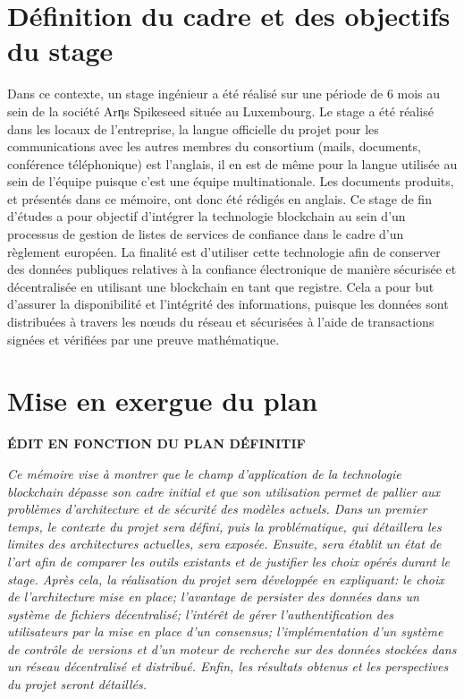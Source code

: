 \documentclass{tnreport}
\begin{document}
\section{Définition du cadre et des objectifs du stage}

Dans ce contexte, un stage ingénieur a été réalisé sur une période de 6 mois au sein de la société Arηs Spikeseed située au Luxembourg. 
Le stage a été réalisé dans les locaux de l'entreprise, la langue officielle du projet pour les communications avec les autres membres du consortium (mails, documents, conférence téléphonique) est l’anglais, il en est de même pour la langue utilisée au sein de l'équipe puisque c'est une équipe multinationale. Les documents produits, et présentés dans ce mémoire, ont donc été rédigés en anglais.
Ce stage de fin d'études a pour objectif d'intégrer la technologie blockchain au sein d'un processus de gestion de listes de services de confiance dans le cadre d'un règlement européen. 
La finalité est d'utiliser cette technologie afin de conserver des données publiques relatives à la confiance électronique de manière sécurisée et décentralisée en utilisant une blockchain en tant que registre.
Cela a pour but d'assurer la disponibilité et l'intégrité des informations, puisque les données sont distribuées à travers les nœuds du réseau et sécurisées à l'aide de transactions signées et vérifiées par une preuve mathématique. 

\section{Mise en exergue du plan}

\textbf{ÉDIT EN FONCTION DU PLAN DÉFINITIF}

\textit{
Ce mémoire vise à montrer que le champ d'application de la technologie blockchain dépasse son cadre initial et que son utilisation permet de pallier aux problèmes d'architecture et de sécurité des modèles actuels. 
Dans un premier temps, le contexte du projet sera défini, puis la problématique, qui détaillera les limites des architectures actuelles, sera exposée. 
Ensuite, sera établit un état de l'art afin de comparer les outils existants et de justifier les choix opérés durant le stage. 
Après cela, la réalisation du projet sera développée en expliquant: 
le choix de l'architecture mise en place; 
l'avantage de persister des données dans un système de fichiers décentralisé; 
l'intérêt de gérer l'authentification des utilisateurs par la mise en place d'un consensus; 
l'implémentation d'un système de contrôle de versions et d'un moteur de recherche sur des données stockées dans un réseau décentralisé et distribué. 
Enfin, les résultats obtenus et les perspectives du projet seront détaillés.
}
\end{document}
